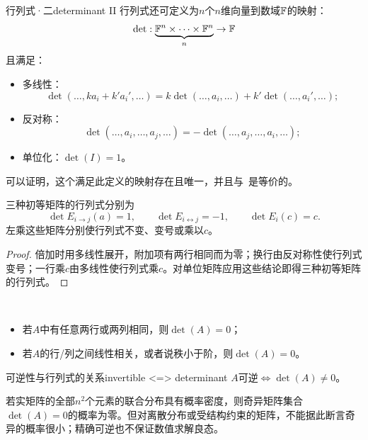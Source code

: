 \begin{definition}
	{行列式·二}{determinant II}
	行列式还可定义为$n$个$n$维向量到数域$\mathbb{F}$的映射：
	\[
		\det:\underbrace{\mathbb{F}^n \times \cdots \times \mathbb{F}^n}_n \to \mathbb{F}
	\]
	且满足：
	\begin{itemize}
		\item 多线性：
		\begin{equation}
			\det(\ldots,ka_i + k'a_i',\ldots) = k\det(\ldots,a_i,\ldots) + k'\det(\ldots,a_i',\ldots);
		\end{equation}
		\item 反对称：
		\begin{equation}
			\det(\ldots,a_i,\ldots,a_j,\ldots) = -\det(\ldots,a_j,\ldots,a_i,\ldots);
		\end{equation}
		\item 单位化：$\det(I) = 1$。
	\end{itemize}
	可以证明，这个满足此定义的映射存在且唯一，并且与~是等价的。
\end{definition}
\begin{lemma}
	三种初等矩阵的行列式分别为
	\begin{equation}\label{eq:la-elementary-determinants}
		\det E_{i\to j}(a) = 1,\qquad
		\det E_{i\leftrightarrow j} = -1,\qquad
		\det E_i(c) = c.
	\end{equation}
	左乘这些矩阵分别使行列式不变、变号或乘以$c$。
\end{lemma}
\begin{proof}
	倍加时用多线性展开，附加项有两行相同而为零；换行由反对称性使行列式变号；一行乘$c$由多线性使行列式乘$c$。对单位矩阵应用这些结论即得三种初等矩阵的行列式。
\end{proof}
\begin{corollary}
	~%
	\begin{itemize}
		\item 若$A$中有任意两行或两列相同，则$\det(A) = 0$；
		\item 若$A$的行/列之间线性相关，或者说秩小于阶，则$\det(A) = 0$。
	\end{itemize}
\end{corollary}


\begin{theorem}
	{可逆性与行列式的关系}{invertible <=> determinant}
	$A$可逆$\iff \det(A) \neq 0$。
\end{theorem}

\begin{remark}
	若实矩阵的全部$n^2$个元素的联合分布具有概率密度，则奇异矩阵集合$\det(A) = 0$的概率为零。但对离散分布或受结构约束的矩阵，不能据此断言奇异的概率很小；精确可逆也不保证数值求解良态。
\end{remark}

